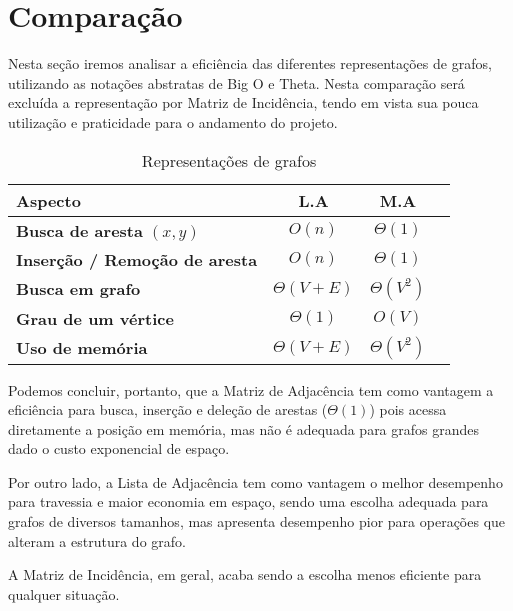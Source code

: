 \section{Comparação}
Nesta seção iremos analisar a eficiência das diferentes representações de grafos, utilizando as notações abstratas de Big O e Theta.
Nesta comparação será excluída a representação por Matriz de Incidência, tendo em vista sua pouca utilização e praticidade para o andamento do projeto.
\begin{table}[H]
\centering
\caption{Representações de grafos}
\begin{tabular}{|l|c|c|c|}
\hline
\textbf{Aspecto} & \textbf{L.A} & \textbf{M.A} \\ \hline
\textbf{Busca de aresta} $(x, y)$ & $O(n)$ & $\Theta(1)$  \\ \hline
\textbf{Inserção / Remoção de aresta} & $O(n)$ & $\Theta(1)$  \\ \hline
\textbf{Busca em grafo} & $\Theta(V + E)$ & $\Theta(V^2)$  \\ \hline
\textbf{Grau de um vértice} & $\Theta(1)$ & $O(V)$ \\ \hline
\textbf{Uso de memória} & $\Theta(V + E)$ & $\Theta(V^2)$ \\ \hline
\end{tabular}
\vspace{0.3em}
\end{table}

Podemos concluir, portanto, que a Matriz de Adjacência tem como vantagem a eficiência para busca, inserção e deleção de arestas ($\Theta(1)$) pois acessa diretamente a posição em memória, mas não é adequada para grafos grandes dado o custo exponencial de espaço.

Por outro lado, a Lista de Adjacência tem como vantagem o melhor desempenho para travessia e maior economia em espaço, sendo uma escolha adequada para grafos de diversos tamanhos, mas apresenta desempenho pior para operações que alteram a estrutura do grafo.

A Matriz de Incidência, em geral, acaba sendo a escolha menos eficiente para qualquer situação.